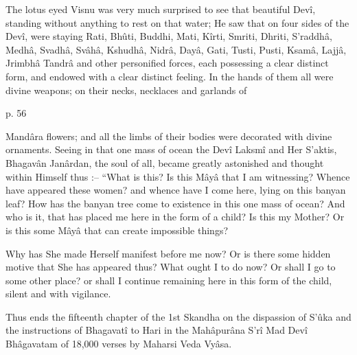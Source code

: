 The lotus eyed Visnu was very much surprised to see that beautiful Devî, standing without anything to rest on that water; He saw that on four sides of the Devî, were staying Rati, Bhûti, Buddhi, Mati, Kîrti, Smriti, Dhriti, S'raddhâ, Medhâ, Svadhâ, Svâhâ, Kshudhâ, Nidrâ, Dayâ, Gati, Tusti, Pusti, Ksamâ, Lajjâ, Jrimbhâ Tandrâ and other personified forces, each possessing a clear distinct form, and endowed with a clear distinct feeling. In the hands of them all were divine weapons; on their necks, necklaces and garlands of

 

p. 56

 

Mandâra flowers; and all the limbs of their bodies were decorated with divine ornaments. Seeing in that one mass of ocean the Devî Laksmî and Her S'aktis, Bhagavân Janârdan, the soul of all, became greatly astonished and thought within Himself thus :-- “What is this? Is this Mâyâ that I am witnessing? Whence have appeared these women? and whence have I come here, lying on this banyan leaf? How has the banyan tree come to existence in this one mass of ocean? And who is it, that has placed me here in the form of a child? Is this my Mother? Or is this some Mâyâ that can create impossible things?

 

Why has She made Herself manifest before me now? Or is there some hidden motive that She has appeared thus? What ought I to do now? Or shall I go to some other place? or shall I continue remaining here in this form of the child, silent and with vigilance.

 

Thus ends the fifteenth chapter of the 1st Skandha on the dispassion of S'ûka and the instructions of Bhagavatî to Hari in the Mahâpurâna S’rî Mad Devî Bhâgavatam of 18,000 verses by Maharsi Veda Vyâsa.